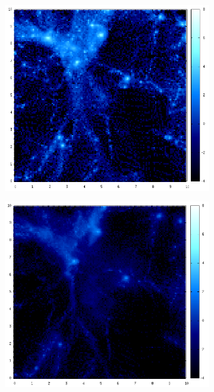 \documentclass[journal]{IEEEtran}
\begin{document}
\begin{figure}[htb]
\begin{subfigure}[t]{0.25\textwidth}
	\end{subfigure}
	\\
	\begin{subfigure}[t]{0.25\textwidth}
		\centering
		\includegraphics[width=\linewidth]{DM07-08.png}
	\end{subfigure}
	\quad
	\begin{subfigure}[t]{0.25\textwidth}
		\centering
		\includegraphics[width=\linewidth]{GAS07-08.png}

\end{subfigure}
\end{figure}
\end{document}
